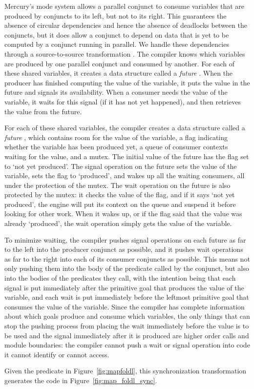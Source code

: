 Mercury's mode system allows a parallel conjunct to consume variables
that are produced by conjuncts to its left, but not to its right.
This guarantees the absence of circular dependencies
and hence the absence of deadlocks between the conjuncts,
but it does allow a conjunct to depend on data that is yet to be computed
by a conjunct running in parallel.
We handle these dependencies through a source-to-source transformation
\cite{wang_dep_par_conj}.
The compiler knows which variables
are produced by one parallel conjunct and consumed by another.
For each of these shared variables,
it creates a data structure called a \emph{future} \cite{multilisp}.
When the producer has finished computing the value of the variable,
it puts the value in the future and signals its availability.
When a consumer needs the value of the variable,
it waits for this signal (if it has not yet happened),
and then retrieves the value from the future.

For each of these shared variables,
the compiler creates a data structure called a \emph{future} \cite{multilisp},
which contains room for the value of the variable,
a flag indicating whether the variable has been produced yet,
a queue of consumer contexts waiting for the value, and a mutex.
The initial value of the future has the flag set to `not yet produced'.
The signal operation on the future sets the value of the variable,
sets the flag to `produced',
and wakes up all the waiting consumers,
all under the protection of the mutex.
The wait operation on the future is also protected by the mutex:
it checks the value of the flag,
and if it says `not yet produced',
the engine will put its context on the queue and suspend it before
looking for other work.
When it wakes up,
or if the flag said that the value was already `produced',
the wait operation simply gets the value of the variable.

To minimize waiting,
the compiler pushes signal operations on each future
as far to the left into the producer conjunct as possible,
and it pushes wait operations
as far to the right into each of its consumer conjuncts as possible.
This means not only pushing them
into the body of the predicate called by the conjunct,
but also into the bodies of the predicates they call,
with the intention being that
each signal is put immediately after
the primitive goal that produces the value of the variable,
and each wait is put immediately before
the leftmost primitive goal that consumes the value of the variable.
Since the compiler has complete information
about which goals produce and consume which variables,
the only things that can stop the pushing process from placing the
wait immediately before the value is to be used and the signal
immediately after it is produced are
higher order calls and module boundaries:
the compiler cannot push a wait or signal operation
into code it cannot identify or cannot access.


Given the \mapfoldl predicate in Figure~\ref{fig:mapfoldl},
this synchronization transformation
generates the code in Figure~\ref{fig:map_foldl_sync}.

